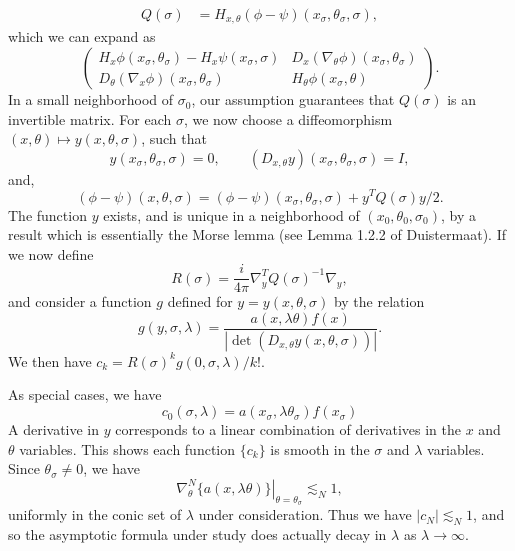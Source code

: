 \begin{theorem}
    \begin{align*}
        Q(\sigma) &= H_{x,\theta}(\phi - \psi)(x_\sigma, \theta_\sigma, \sigma),
    \end{align*}
    which we can expand as
    \[ \begin{pmatrix} H_x \phi(x_\sigma, \theta_\sigma) - H_x \psi(x_\sigma, \sigma) & D_x ( \nabla_\theta \phi ) (x_\sigma, \theta_\sigma) \\ D_\theta( \nabla_x \phi)(x_\sigma, \theta_\sigma) & H_\theta \phi(x_\sigma, \theta) \end{pmatrix}. \]
    In a small neighborhood of $\sigma_0$, our assumption guarantees that $Q(\sigma)$ is an invertible matrix. For each $\sigma$, we now choose a diffeomorphism $(x,\theta) \mapsto y(x,\theta,\sigma)$, such that
    \[ y(x_\sigma, \theta_\sigma, \sigma) = 0, \quad\quad (D_{x,\theta} y)(x_\sigma, \theta_\sigma, \sigma) = I, \]
    and,
    \[ (\phi - \psi)(x,\theta,\sigma) = (\phi - \psi)(x_\sigma, \theta_\sigma, \sigma) + y^T Q(\sigma) y / 2. \]
    The function $y$ exists, and is unique in a neighborhood of $(x_0, \theta_0, \sigma_0)$, by a result which is essentially the Morse lemma (see Lemma 1.2.2 of Duistermaat). If we now define
    \[ R(\sigma) = \frac{i}{4 \pi} \nabla_y^T Q(\sigma)^{-1} \nabla_y, \]
    and consider a function $g$ defined for $y = y(x,\theta,\sigma)$ by the relation
    \[ g(y,\sigma,\lambda) = \frac{a(x, \lambda \theta) f(x) }{| \det(D_{x,\theta} y(x,\theta,\sigma)) |}. \]
    We then have $c_k = R(\sigma)^k g(0,\sigma,\lambda) / k!$.

    As special cases, we have
    \[ c_0(\sigma,\lambda) = a(x_\sigma, \lambda \theta_\sigma) f(x_\sigma) \]
    A derivative in $y$ corresponds to a linear combination of derivatives in the $x$ and $\theta$ variables. This shows each function $\{ c_k \}$ is smooth in the $\sigma$ and $\lambda$ variables. Since $\theta_\sigma \neq 0$, we have 
    \[ \left. \nabla_\theta^N \{ a(x, \lambda \theta) \} \right|_{\theta = \theta_\sigma} \lesssim_N 1, \]
    uniformly in the conic set of $\lambda$ under consideration. Thus we have $|c_N| \lesssim_N 1$, and so the asymptotic formula under study does actually decay in $\lambda$ as $\lambda \to \infty$.
\end{theorem}

